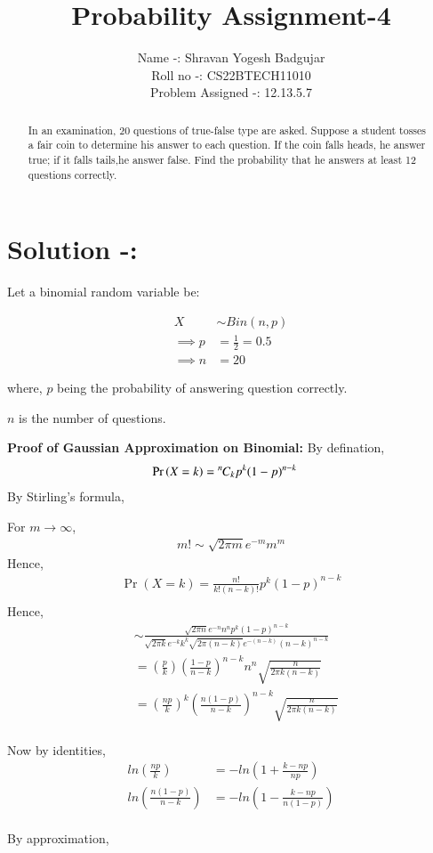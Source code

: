 \documentclass[journal,12pt,twocolumn]{IEEEtran}
\title{
		Probability Assignment-4
}
\author{ Name -: Shravan Yogesh Badgujar
	
	Roll no -: CS22BTECH11010
	
	Problem Assigned -: 12.13.5.7%
	
	
}
\providecommand{\pr}[1]{\ensuremath{\Pr\left(#1\right)}}
\theoremstyle{remark}
\newcommand{\permcomb}[4][0mu]{{{}^{#3}\mkern#1#2_{#4}}}
\newcommand{\comb}[1][-1mu]{\permcomb[#1]{C}}
\begin{document}
\maketitle

\begin{abstract}
	In an examination, 20 questions of
	true-false type are asked. Suppose a student tosses
	a fair coin to determine his answer to each question.
	If the coin falls heads, he answer true; if it falls tails,he answer false. Find the probability that he answers
	at least 12 questions correctly.
\end{abstract}


\section*{Solution -:}
Let a binomial random variable be:

\begin{align} 
	X &\sim Bin(n,p)\\
	\implies p &= \frac{1}{2} = 0.5\\ 
	\implies n &= 20
\end{align}	   

where, $p$ being the probability of answering question correctly.

$n$ is the number of questions.

\textbf{Proof of Gaussian Approximation on Binomial:}
By defination,
\begin{align}
	\pr{X = k} &= \comb{n}{k} p^k (1-p)^{n-k}  
\end{align}
By Stirling's formula,

For \( m \to \infty\),
\begin{align}
	m! \sim \sqrt{2\pi m}e^{-m}m^m
\end{align}
Hence,
\begin{align}
	\pr{X = k} = \frac{n!}{k!(n-k)!} p^k (1-p)^{n-k}\\
\end{align}
Hence,
\begin{align}
	&\sim \frac{\sqrt{2\pi n}e^{-n}n^n p^k (1-p)^{n-k}}{\sqrt{2\pi k}e^{-k}k^k \sqrt{2\pi (n-k)}e^{-(n-k)}(n-k)^{n-k}}\\
	&= \left(\frac{p}{k}\right)\left(\frac{1-p}{n-k}\right)^{n-k}n^n \sqrt{\frac{n}{2\pi k (n-k)}}\\
	&= \left(\frac{np}{k}\right)^{k}\left(\frac{n(1-p)}{n-k}\right)^{n-k}\sqrt{\frac{n}{2\pi k (n-k)}}
\end{align}
\\
Now by identities,
\begin{align}
	ln\left(\frac{np}{k}\right)&= -ln\left(1 + \frac{k-np}{np}\right)\\
	ln\left(\frac{n(1-p)}{n-k}\right)&= -ln\left(1 - \frac{k-np}{n(1-p)}\right)
\end{align}
\\
By approximation,
\end{document}
